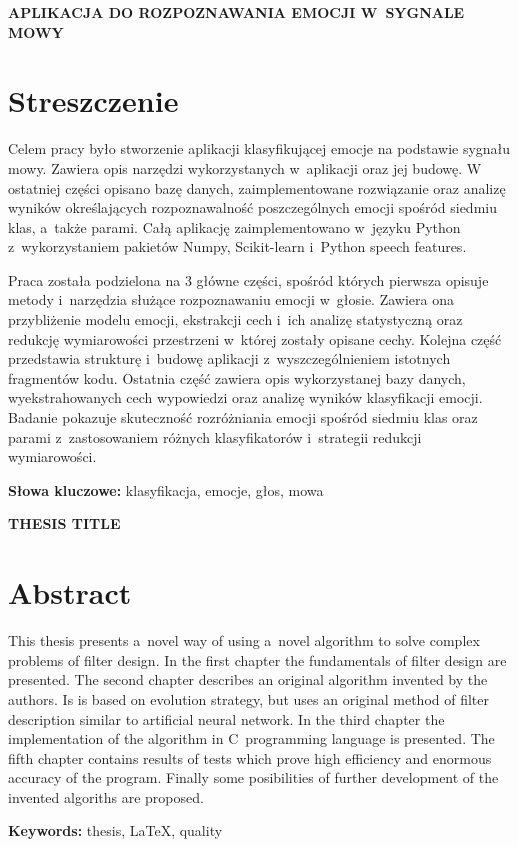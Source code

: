 \newpage
\begin{center}
\large \bf
APLIKACJA DO ROZPOZNAWANIA EMOCJI W~SYGNALE MOWY
\end{center}

\section*{Streszczenie}
Celem pracy było stworzenie aplikacji klasyfikującej emocje na podstawie sygnału mowy.
Zawiera opis narzędzi wykorzystanych w~aplikacji oraz jej budowę.
W ostatniej części opisano bazę danych, zaimplementowane rozwiązanie oraz analizę wyników określających rozpoznawalność poszczególnych emocji spośród siedmiu klas, a~także parami.
Całą aplikację zaimplementowano w~języku Python z~wykorzystaniem pakietów Numpy, Scikit-learn i~Python speech features.

Praca została podzielona na 3 główne części, spośród których pierwsza opisuje metody i~narzędzia służące rozpoznawaniu emocji w~głosie.
Zawiera ona przybliżenie modelu emocji, ekstrakcji cech i~ich analizę statystyczną oraz redukcję wymiarowości przestrzeni w~której zostały opisane cechy.
Kolejna część przedstawia strukturę i~budowę aplikacji z~wyszczególnieniem istotnych fragmentów kodu.
Ostatnia część zawiera opis wykorzystanej bazy danych, wyekstrahowanych cech wypowiedzi oraz analizę wyników klasyfikacji emocji.
Badanie pokazuje skuteczność rozróżniania emocji spośród siedmiu klas oraz parami z~zastosowaniem różnych klasyfikatorów i~strategii redukcji wymiarowości.

\bigskip
{\noindent\bf Słowa kluczowe:} klasyfikacja, emocje, głos, mowa

\newpage

\begin{center}
\large \bf
THESIS TITLE
\end{center}

\section*{Abstract}
This thesis presents a~novel way of using a~novel algorithm to solve complex
problems of filter design. In the first chapter the fundamentals of filter design
are presented. The second chapter describes an original algorithm invented by the
authors. Is is based on evolution strategy, but uses an original method of filter
description similar to artificial neural network. In the third chapter the implementation
of the algorithm in C~programming language is presented. The fifth chapter contains results
of tests which prove high efficiency and enormous accuracy of the program. Finally some
posibilities of further development of the invented algoriths are proposed.

\bigskip
{\noindent\bf Keywords:} thesis, LaTeX, quality

\vfill

